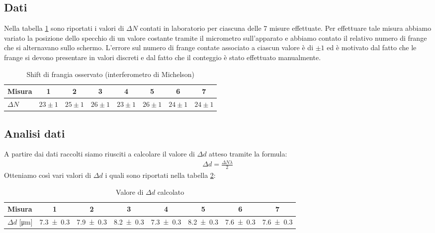 \documentclass[a4paper]{article}
\begin{document}
\subsection{Dati}
Nella tabella \ref{tab:micrometro-michelson} sono riportati i valori di $\Delta N$ contati in laboratorio per ciascuna delle 7 misure effettuate. Per effettuare tale misura abbiamo variato la posizione dello specchio di un valore costante tramite il micrometro sull'apparato e abbiamo contato il relativo numero di frange che si alternavano sullo schermo. L'errore sul numero di frange contate associato a ciascun valore è di $\pm1$ ed è motivato dal fatto che le frange si devono presentare in valori discreti e dal fatto che il conteggio è stato effettuato manualmente. 

\begin{table}[htbp]
\caption{Shift di frangia osservato (interferometro di Michelson)}
\label{tab:micrometro-michelson}
\centering
\begin{tabular}{|l|ccccccc|}
\hline
Misura & 1 & 2 & 3 & 4 & 5 & 6 & 7 \\\hline\hline
$\Delta N$ & $23 \pm 1$ & $25 \pm 1$ & $26 \pm 1$ & $23 \pm 1$ & $26 \pm 1$ & $24 \pm 1$ & $24 \pm 1$ \\\hline
\end{tabular}
\end{table}

\subsection{Analisi dati}
A partire dai dati raccolti siamo riusciti a calcolare il valore di $\Delta d$ atteso tramite la formula: 
\begin{align}
    \Delta d=\frac{\Delta N \lambda}{2}
\end{align}
Otteniamo così vari valori di $\Delta d$ i quali sono riportati nella tabella \ref{tab:valori-d-michelson}:

\begin{table}[htbp]
\caption{Valore di $\Delta d$ calcolato}
\label{tab:valori-d-michelson}
\centering
\begin{tabular}{|l|ccccccc|}
\hline
Misura & 1 & 2 & 3 & 4 & 5 & 6 & 7 \\\hline\hline
$\Delta d$ [\si{\micro\meter}]& \num{7.3 \pm 0.3} & \num{7.9 \pm 0.3} & \num{8.2 \pm 0.3} & \num{7.3 \pm 0.3} & \num{8.2 \pm 0.3} & \num{7.6 \pm 0.3} & \num{7.6 \pm 0.3}   \\\hline
\end{tabular}
\end{table} 
\end{document}
